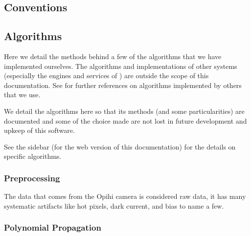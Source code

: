 \documentclass[letterpaper,11pt,english]{sphinxmanual}
\begin{document}
\sphinxstepscope


\subsection{Conventions}
\label{\detokenize{technical/conventions:conventions}}\label{\detokenize{technical/conventions:technical-conventions}}\label{\detokenize{technical/conventions::doc}}
\sphinxstepscope


\subsection{Algorithms}
\label{\detokenize{technical/algorithms/index:algorithms}}\label{\detokenize{technical/algorithms/index::doc}}
\sphinxAtStartPar
Here we detail the methods behind a few of the algorithms that we have
implemented ourselves. The algorithms and implementations of other systems
(especially the engines and services of
{\hyperref[\detokenize{technical/architecture/services_engines:technical-architecture-services-engines}]{}}) are outside the scope of this
documentation. See {\hyperref[\detokenize{user/citations:user-citations}]{}} for further references on algorithms
implemented by others that we use.

\sphinxAtStartPar
We detail the algorithms here so that its methods (and some particularities)
are documented and some of the choice made are not lost in future development
and upkeep of this software.

\sphinxAtStartPar
See the sidebar (for the web version of this documentation) for the details on
specific algorithms.

\sphinxstepscope


\subsubsection{Preprocessing}
\label{\detokenize{technical/algorithms/preprocessing:preprocessing}}\label{\detokenize{technical/algorithms/preprocessing:technical-algorithms-preprocessing}}\label{\detokenize{technical/algorithms/preprocessing::doc}}
\sphinxAtStartPar
The data that comes from the Opihi camera is considered raw data, it has many
systematic artifacts like hot pixels, dark current, and bias to name a few.

\sphinxstepscope


\subsubsection{Polynomial Propagation}
\label{\detokenize{technical/algorithms/polynomial_propagation:polynomial-propagation}}\label{\detokenize{technical/algorithms/polynomial_propagation:technical-algorithms-polynomial-propagation}}\label{\detokenize{technical/algorithms/polynomial_propagation::doc}}
\sphinxstepscope
\end{document}
